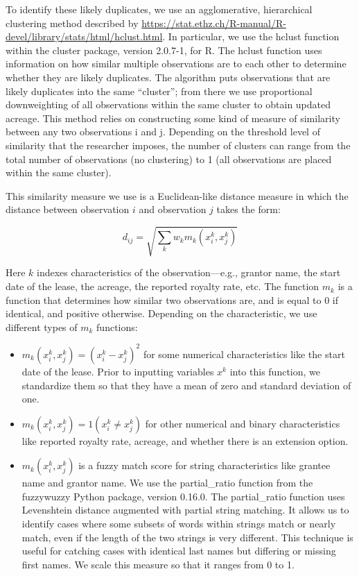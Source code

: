 \documentclass[12pt]{article}
\begin{document}
To identify these likely duplicates, we use an agglomerative, hierarchical clustering method described by \url{https://stat.ethz.ch/R-manual/R-devel/library/stats/html/hclust.html}. In particular, we use the hclust function within the cluster package, version 2.0.7-1, for R. The hclust function uses information on how similar multiple observations are to each other to determine whether they are likely duplicates. The algorithm puts observations that are likely duplicates into the same ``cluster''; from there we use proportional downweighting of all observations within the same cluster to obtain updated acreage. This method relies on constructing some kind of measure of similarity between any two observations i and j. Depending on the threshold level of similarity that the researcher imposes, the number of clusters can range from the total number of observations (no clustering) to 1 (all observations are placed within the same cluster).

This similarity measure we use is a Euclidean-like distance measure in which the distance between observation $i$ and observation $j$ takes the form:

\begin{equation}
d_{ij} = \sqrt{\sum_k{w_k m_k(x_i^k, x_j^k)}}
\end{equation}

Here $k$ indexes characteristics of the observation---e.g., grantor name, the start date of the lease, the acreage, the reported royalty rate, etc. The function $m_k$ is a function that determines how similar two observations are, and is equal to 0 if identical, and positive otherwise. Depending on the characteristic, we use different types of $m_k$ functions:

\begin{itemize}
\item $m_k(x_i^k,x_j^k) = (x_i^k-x_j^k)^2$ for some numerical characteristics like the start date of the lease. Prior to inputting variables $x^k$ into this function, we standardize them so that they have a mean of zero and standard deviation of one.
\item $m_k(x_i^k,x_j^k) = 1(x_i^k\neq x_j^k)$ for other numerical and binary characteristics like reported royalty rate, acreage, and whether there is an extension option.
\item $m_k(x_i^k,x_j^k)$ is a fuzzy match score for string characteristics like grantee name and grantor name. We use the partial\_ratio function from the fuzzywuzzy Python package, version 0.16.0. The partial\_ratio function uses Levenshtein distance augmented with partial string matching. It allows us to identify cases where some subsets of words within strings match or nearly match, even if the length of the two strings is very different. This technique is useful for catching cases with identical last names but differing or missing first names. We scale this measure so that it ranges from 0 to 1.
\end{itemize}
\end{document}
